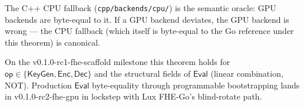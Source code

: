 \begin{remark}
\label{rem:cpu-fallback-oracle}
The C++ CPU fallback (\texttt{cpp/backends/cpu/}) is the semantic oracle:
GPU backends are byte-equal to it. If a GPU backend deviates, the GPU
backend is wrong --- the CPU fallback (which itself is byte-equal to the
Go reference under this theorem) is canonical.
\end{remark}

\begin{remark}
\label{rem:fhe-scaffold-status}
On the v0.1.0-rc1-fhe-scaffold milestone this theorem holds for $\mathsf{op}
\in \{\mathsf{KeyGen}, \mathsf{Enc}, \mathsf{Dec}\}$ and the structural
fields of $\mathsf{Eval}$ (linear combination, NOT). Production
$\mathsf{Eval}$ byte-equality through programmable bootstrapping lands in
v0.1.0-rc2-fhe-gpu in lockstep with Lux FHE-Go's blind-rotate path.
\end{remark}
